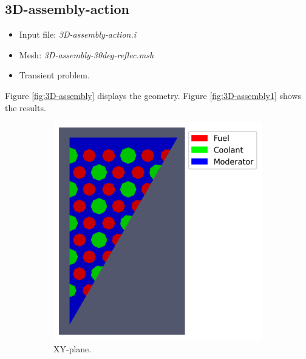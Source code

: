 \documentclass[11pt,letterpaper]{article}
\begin{document}
\subsection{3D-assembly-action}

	\begin{itemize}
		\item Input file: \textit{3D-assembly-action.i}
		\item Mesh: \textit{3D-assembly-30deg-reflec.msh}
		\item Transient problem.
	\end{itemize}

Figure \ref{fig:3D-assembly} displays the geometry.
Figure \ref{fig:3D-assembly1} shows the results.

	\begin{figure}[htbp!]
		\centering
		\begin{subfigure}[t]{0.4\textwidth}
			\centering
			\includegraphics[width=\linewidth]{3D-assembly-mesh1}
			\caption{XY-plane.}
		\end{subfigure}
		\begin{subfigure}[t]{0.4\textwidth}
			\centering

\end{subfigure}
\end{figure}
\end{document}
